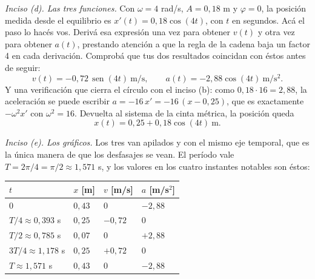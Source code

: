\documentclass[11pt,openany]{book}
\newcommand{\sen}{\operatorname{sen}}
\begin{document}
\begin{ejemplo}[completo]
\medskip
\textit{Inciso (d). Las tres funciones.} Con $\omega = 4$ rad/s, $A = 0{,}18$ m y $\varphi = 0$, la posición medida desde el equilibrio es $x'(t) = 0{,}18\cos(4t)$, con $t$ en segundos. Acá el paso lo hacés vos. Derivá esa expresión una vez para obtener $v(t)$ y otra vez para obtener $a(t)$, prestando atención a que la regla de la cadena baja un factor 4 en cada derivación. Comprobá que tus dos resultados coincidan con éstos antes de seguir:
\[
v(t) = -0{,}72\,\sen(4t)\ \mathrm{m/s},
\qquad
a(t) = -2{,}88\cos(4t)\ \mathrm{m/s^2} .
\]
Y una verificación que cierra el círculo con el inciso (b): como $0{,}18 \cdot 16 = 2{,}88$, la aceleración se puede escribir $a = -16\,x' = -16\,(x - 0{,}25)$, que es exactamente $-\omega^2 x'$ con $\omega^2 = 16$. Devuelta al sistema de la cinta métrica, la posición queda
\[
x(t) = 0{,}25 + 0{,}18\cos(4t)\ \mathrm{m} .
\]

\medskip
\textit{Inciso (e). Los gráficos.} Los tres van apilados y con el mismo eje temporal, que es la única manera de que los desfasajes se vean. El período vale $T = 2\pi/4 = \pi/2 \approx 1{,}571$ s, y los valores en los cuatro instantes notables son éstos:

\begin{center}
\begin{tabular}{llll}
\toprule
$t$ & $x$ [m] & $v$ [m/s] & $a$ [m/s$^2$] \\
\midrule
$0$ & $0{,}43$ & $0$ & $-2{,}88$ \\
$T/4 \approx 0{,}393$ s & $0{,}25$ & $-0{,}72$ & $0$ \\
$T/2 \approx 0{,}785$ s & $0{,}07$ & $0$ & $+2{,}88$ \\
$3T/4 \approx 1{,}178$ s & $0{,}25$ & $+0{,}72$ & $0$ \\
$T \approx 1{,}571$ s & $0{,}43$ & $0$ & $-2{,}88$ \\
\bottomrule
\end{tabular}
\end{center}


\end{ejemplo}
\end{document}
